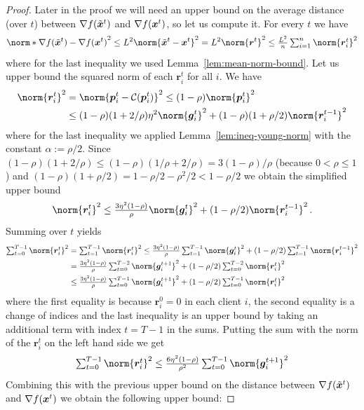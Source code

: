 \documentclass{article}
\begin{document}
\begin{proof}
  Later in the proof we will need an upper bound on the average distance (over $t$) between $\nabla f(\tilde {\bm{x}}^t)$ and $\nabla f(\bm{x}^t)$, so let us compute it. For every $t$ we have
  \[
    \norm*{\nabla f(\tilde \xx^t) - \nabla f(\xx^t)}^2
    \leq
    L^2 \norm{\tilde \xx^t - \xx^t}^2
    =
    L^2 \norm{\bm r^t}^2
    \le
    \tfrac{L^2}{n} \tsum_{i=1}^n \norm{\bm r_i^t}^2
  \]
  where for the last inequality we used Lemma~\ref{lem:mean-norm-bound}.
  Let us upper bound the squared norm of each $\bm r_i^t$ for all $i$. We have
  \begin{align*}
    \norm{\bm r_i^t}^2
     & =
    \norm{\pp_i^t - \mathcal C(\pp_i^t)}^2
    \leq
    (1-\rho) \norm{\pp_i^t}^2
    \\
     & \leq
    (1-\rho) (1 + 2/\rho) \eta^2 \norm{\gg_i^t}^2 + (1-\rho)  (1 + \rho/2) \norm{\bm r_i^{t-1}}^2
  \end{align*}
  where for the last inequality we applied Lemma~\ref{lem:ineq-young-norm} with the constant $\alpha := \rho/2$. Since $(1-\rho)(1+2/\rho) \leq (1-\rho) (1/\rho+2/\rho) = 3(1-\rho)/\rho$ (because $0 < \rho \leq 1$) and $(1-\rho)(1+\rho/2) = 1 - \rho/2 - \rho^2/2 < 1 - \rho/2$ we obtain the simplified upper bound
  \[
    \norm{\bm r_i^t}^2
    \leq
    \tfrac{3 \eta^2 (1-\rho)}{\rho} \norm{\gg_i^t}^2 + (1-\rho/2) \norm{\bm r_i^{t-1}}^2
    \, .
  \]
  Summing over $t$ yields
  \begin{align*}
    \tsum_{t=0}^{T-1} \norm{\bm r_i^t}^2
     & =
    \tsum_{t=1}^{T-1} \norm{\bm r_i^t}^2
    \leq
    \tfrac{3 \eta^2 (1-\rho)}{\rho} \tsum_{t=1}^{T-1}  \norm{\gg_i^t}^2 + (1-\rho/2) \tsum_{t=1}^{T-1}  \norm{\bm r_i^{t-1}}^2
    \\
     & =
    \tfrac{3 \eta^2 (1-\rho)}{\rho} \tsum_{t=0}^{T-2}  \norm{\gg_i^{t+1}}^2 + (1-\rho/2) \tsum_{t=0}^{T-2}  \norm{\bm r_i^t}^2
    \\
     & \leq
    \tfrac{3 \eta^2 (1-\rho)}{\rho} \tsum_{t=0}^{T-1}  \norm{\gg_i^{t+1}}^2 + (1-\rho/2) \tsum_{t=0}^{T-1}  \norm{\bm r_i^t}^2
  \end{align*}
  where the first equality is because $\bm r_i^0 = 0$ in each client $i$, the second equality is a change of indices and the last inequality is an upper bound by taking an additional term with index $t = T-1$ in the sums. Putting the sum with the norm of the $\bm r_i^t$ on the left hand side we get
  \[
    \tsum_{t=0}^{T-1} \norm{\bm r_i^t}^2
    \leq
    \tfrac{6 \eta^2 (1-\rho)}{\rho^2} \tsum_{t=0}^{T-1}  \norm{\gg_i^{t+1}}^2
  \]
  Combining this with the previous upper bound on the distance between $\nabla f(\tilde {\bm{x}}^t)$ and $\nabla f(\bm{x}^t)$ we obtain the following upper bound:

\end{proof}
\end{document}

